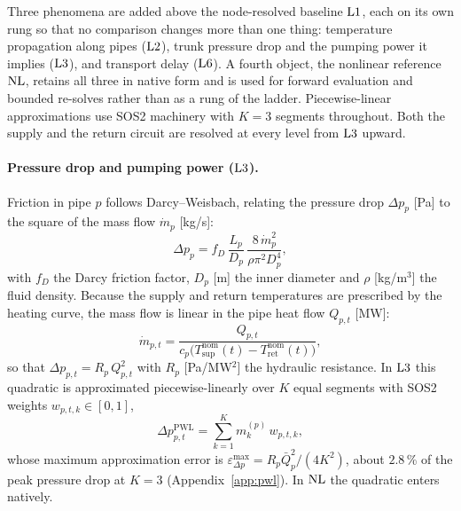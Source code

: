 
Three phenomena are added above the node-resolved baseline $\mathrm{L1}$, each on its own rung so
that no comparison changes more than one thing: temperature propagation along pipes
($\mathrm{L2}$), trunk pressure drop and the pumping power it implies ($\mathrm{L3}$), and transport
delay ($\mathrm{L6}$). A fourth object, the nonlinear reference $\mathrm{NL}$, retains all three in
native form and is used for forward evaluation and bounded re-solves rather than as a rung
of the ladder. Piecewise-linear approximations use SOS2 machinery with $K = 3$ segments
throughout. Both the supply and the return circuit are resolved at every level from
$\mathrm{L3}$ upward.

\paragraph{Pressure drop and pumping power ($\mathrm{L3}$).}
Friction in pipe $p$ follows Darcy--Weisbach, relating the pressure drop $\Delta p_p$ [Pa]
to the square of the mass flow $\dot{m}_p$ [kg/s]:
%
\begin{equation}
  \Delta p_{p} = f_D\, \frac{L_p}{D_p}\,
    \frac{8\,\dot{m}_p^2}{\rho \pi^2 D_p^4},
  \label{eq:darcy}
\end{equation}
%
with $f_D$ the Darcy friction factor, $D_p$ [m] the inner diameter and $\rho$ [kg/m$^3$]
the fluid density. Because the supply and return temperatures are prescribed by the
heating curve, the mass flow is linear in the pipe heat flow $Q_{p,t}$ [MW]:
%
\begin{equation}
  \dot{m}_{p,t} = \frac{Q_{p,t}}{
    c_p \bigl(T_{\mathrm{sup}}^{\mathrm{nom}}(t)
    - T_{\mathrm{ret}}^{\mathrm{nom}}(t)\bigr)},
  \label{eq:massflow}
\end{equation}
%
so that $\Delta p_{p,t} = R_p\, Q_{p,t}^2$ with $R_p$ [Pa/MW$^2$] the hydraulic resistance.
In $\mathrm{L3}$ this quadratic is approximated piecewise-linearly over $K$ equal segments with
SOS2 weights $w_{p,t,k} \in [0,1]$,
%
\begin{equation}
  \Delta p_{p,t}^{\mathrm{PWL}} = \sum_{k=1}^{K}
    m_k^{(p)}\, w_{p,t,k},
  \label{eq:pressure_pwl}
\end{equation}
%
whose maximum approximation error is $\varepsilon^{\max}_{\Delta p} = R_p \bar{Q}_p^2/(4K^2)$,
about $2.8$\,\% of the peak pressure drop at $K = 3$ (Appendix~\ref{app:pwl}). In $\mathrm{NL}$
the quadratic enters natively.

